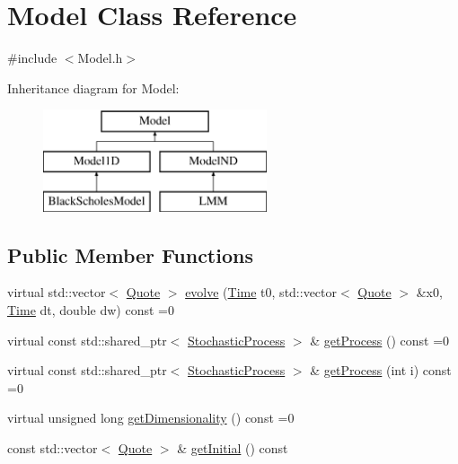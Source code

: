\hypertarget{class_model}{}\section{Model Class Reference}
\label{class_model}


{\ttfamily \#include $<$Model.\+h$>$}

Inheritance diagram for Model\+:\begin{figure}[H]
\begin{center}
\leavevmode
\includegraphics[height=3.000000cm]{class_model}
\end{center}
\end{figure}
\subsection*{Public Member Functions}
\begin{DoxyCompactItemize}
\item 
virtual std\+::vector$<$ \hyperlink{_name_def_8h_a642a6c5fd87319d922637de0e0bb0305}{Quote} $>$ \hyperlink{class_model_a087d56280bb51e8b04be3a9a30d06c76}{evolve} (\hyperlink{_name_def_8h_ac2d3e0ba793497bcca555c7c2cf64ff3}{Time} t0, std\+::vector$<$ \hyperlink{_name_def_8h_a642a6c5fd87319d922637de0e0bb0305}{Quote} $>$ \&x0, \hyperlink{_name_def_8h_ac2d3e0ba793497bcca555c7c2cf64ff3}{Time} dt, double dw) const =0
\item 
virtual const std\+::shared\+\_\+ptr$<$ \hyperlink{class_stochastic_process}{Stochastic\+Process} $>$ \& \hyperlink{class_model_adc6a695d3f6b2def79f2dde69b3ab547}{get\+Process} () const =0
\item 
virtual const std\+::shared\+\_\+ptr$<$ \hyperlink{class_stochastic_process}{Stochastic\+Process} $>$ \& \hyperlink{class_model_a23adaaf21b2955a1f4d4893ad9b77f02}{get\+Process} (int i) const =0
\item 
virtual unsigned long \hyperlink{class_model_acbe41cf30367bce4b96e92812d644f2d}{get\+Dimensionality} () const =0
\item 
const std\+::vector$<$ \hyperlink{_name_def_8h_a642a6c5fd87319d922637de0e0bb0305}{Quote} $>$ \& \hyperlink{class_model_ade5d08aae4d32777bfa048f356bbcca9}{get\+Initial} () const
\end{DoxyCompactItemize}
